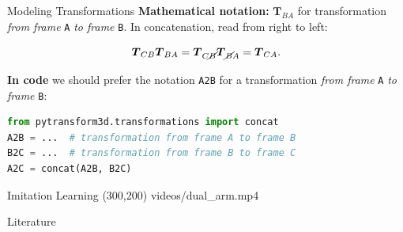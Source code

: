 \documentclass[14pt,aspectratio=169]{beamer}
\begin{document}
\begin{frame}{Modeling Transformations}
\textbf{Mathematical notation:}
$\boldsymbol{T}_{BA}$ for transformation \textit{from frame} \texttt{A} \textit{to frame}
\texttt{B}. In concatenation, read from right to left:

\[
\boldsymbol{T}_{CB} \boldsymbol{T}_{BA} = \boldsymbol{T}_{C\cancel{B}} \boldsymbol{T}_{\cancel{B}A} = \boldsymbol{T}_{CA}.
\]

\vfill

\textbf{In code} we should prefer the notation \texttt{A2B}
for a transformation \textit{from frame} \texttt{A} \textit{to frame} \texttt{B}:

\begin{lstlisting}[language=Python]
from pytransform3d.transformations import concat
A2B = ...  # transformation from frame A to frame B
B2C = ...  # transformation from frame B to frame C
A2C = concat(A2B, B2C)
\end{lstlisting}
\end{frame}

\begin{frame}[fragile]{Imitation Learning}
\makebox(300,200){
{videos/dual_arm.mp4}}
\end{frame}

\begin{frame}[t,allowframebreaks]{Literature}
\printbibliography[heading=none]
\end{frame}
\end{document}

